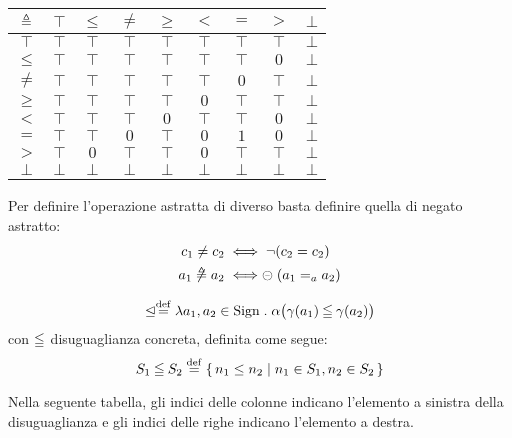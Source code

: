 \begin{center}
  \begin{tabular}{ c | c c c c c c c c }
    $\mathrel{\triangleq}$ & $\top$ & $\leq$ & $\neq$ & $\geq$ & $<$ & $=$ & $>$ & $\bot$ \\
    \hline
    $\top$ & $\top$ & $\top$ & $\top$ & $\top$ & $\top$ & $\top$ & $\top$ & $\bot$ \\
    $\leq$ & $\top$ & $\top$ & $\top$ & $\top$ & $\top$ & $\top$ & $0$ & $\bot$\\
    $\neq$ & $\top$ & $\top$ & $\top$ & $\top$ & $\top$ & $0$ & $\top$ & $\bot$\\
    $\geq$ & $\top$ & $\top$ & $\top$ & $\top$ & $0$ & $\top$ & $\top$ & $\bot$\\
    $<$ & $\top$ & $\top$ & $\top$ & $0$ & $\top$ & $\top$ & $0$ & $\bot$\\
    $=$ & $\top$ & $\top$ & $0$ & $\top$ & $0$ & $1$ & $0$ & $\bot$\\
    $>$ & $\top$ & $0$ & $\top$ & $\top$ & $0$ & $\top$ & $\top$ & $\bot$\\
    $\bot$ & $\bot$ & $\bot$ & $\bot$ & $\bot$ & $\bot$ & $\bot$ & $\bot$ & $\bot$
  \end{tabular}
\end{center}


\begin{definizione}
Per definire l'operazione astratta di diverso basta definire quella di negato astratto:
\begin{align*}
  c_1 \neq c_2 &\iff \neg (c_2 = c_2) \\
  a_1 \mathrel{\not\triangleq} a_2 &\iff \mathrel{\circleddash} (a_1 =_a a_2)
\end{align*}
\end{definizione}

\begin{definizione}
\[
  \absleq \defeq \lambda a_1,a_2 \in \Sign \st \alpha\bigl(\gamma(a_1) \conineq \gamma(a_2)\bigr)
\]
con $\mathbin{\leqq}$ disuguaglianza concreta, definita come segue:
\[
  S_1 \conineq S_2 \defeq \{\, n_1 \leq n_2 \mid n_1 \in S_1, n_2 \in S_2 \,\}
\]
\end{definizione}
Nella seguente tabella, gli indici delle colonne indicano
l'elemento a sinistra della disuguaglianza e gli indici delle righe
indicano l'elemento a destra.

